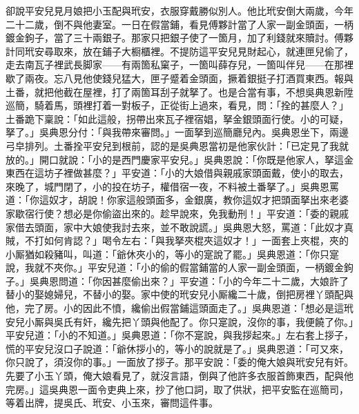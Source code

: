 卻說平安兒見月娘把小玉配與玳安，衣服穿戴勝似別人。他比玳安倒大兩歲，今年二十二歲，倒不與他妻室。一日在假當鋪，看見傅夥計當了人家一副金頭面，一柄鍍金鉤子，當了三十兩銀子。那家只把銀子使了一箇月，加了利錢就來贖討。傅夥計同玳安尋取來，放在鋪子大橱櫃裡。不提防這平安兒見財起心，就連匣兒偷了，走去南瓦子裡武長脚家——有兩箇私窠子，一箇叫薛存兒，一箇叫伴兒——在那裡歇了兩夜。忘八見他使錢兒猛大，匣子蹙着金頭面，撅着銀挺子打酒買東西。報與土番，就把他截在屋裡，打了兩箇耳刮子就拏了。也是合當有事，不想吳典恩新陞巡簡，騎着馬，頭裡打着一對板子，正從街上過來，看見，問：「拴的甚麼人？」土番跪下稟說：「如此這般，拐帶出來瓦子裡宿娼，拏金銀頭面行使。小的可疑，拏了。」吳典恩分付：「與我帶來審問。」一面拏到巡簡廳兒內。吳典恩坐下，兩邊弓皁排列。土番拴平安兒到根前，認的是吳典恩當初是他家伙計：「已定見了我就放的。」開口就說：「小的是西門慶家平安兒。」吳典恩說：「你既是他家人，拏這金東西在這坊子裡做甚麼？」平安道：「小的大娘借與親戚家頭面戴，使小的取去，來晚了，城門閉了，小的投在坊子，權借宿一夜，不料被土番拏了。」吳典恩罵道：「你這奴才，胡說！你家這般頭面多，金銀廣，教你這奴才把頭面拏出來老婆家歇宿行使？{}想必是你偷盜出來的。趁早說來，免我動刑！」平安道：「委的親戚家借去頭面，家中大娘使我討去來，並不敢說謊。」吳典恩大怒，罵道：「此奴才真賊，不打如何肯認？」喝令左右：「與我拏夾棍夾這奴才！」一面套上夾棍，夾的小厮猶如殺豬叫，叫道：「爺休夾小的，等小的寔說了罷。」吳典恩道：「你只寔說，我就不夾你。」平安兒道：「小的偷的假當鋪當的人家一副金頭面，一柄鍍金鉤子。」吳典恩問道：「你因甚麼偷出來？」平安道：「小的今年二十二歲，大娘許了替小的娶媳婦兒，不替小的娶。家中使的玳安兒小厮纔二十歲，倒把房裡丫頭配與他，完了房。小的因此不憤，纔偷出假當鋪這頭面走了。」吳典恩道：「想必是這玳安兒小厮與吳氏有奸，纔先把丫頭與他配了。你只寔說，沒你的事，我便饒了你。」{}平安兒道：「小的不知道。」吳典恩道：「你不寔說，與我拶起來。」左右套上拶子，慌的平安兒沒口子說道：「爺休拶小的，等小的說就是了。」吳典恩道：「可又來，你只說了，須沒你的事。」一面放了拶子。那平安說：「委的俺大娘與玳安兒有奸。先要了小玉丫頭，俺大娘看見了，就沒言語，倒與了他許多衣服首飾東西，配與他完房。」這吳典恩一面令吏典上來，抄了他口詞，取了供狀，把平安監在巡簡司，等着出牌，提吳氏、玳安、小玉來，審問這件事。

